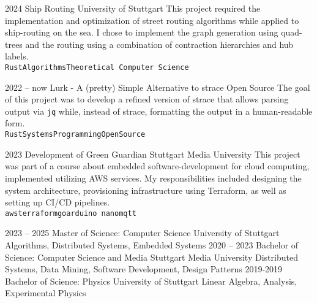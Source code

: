 \documentclass[9pt]{developercv} %
\begin{document}
\begin{entrylist}
	\entry
		{2024}
		{Ship Routing}
		{University of Stuttgart}
		{This project required the implementation and optimization of street routing algorithms while applied to ship-routing on the sea. I chose to implement the graph generation using quad-trees and the routing using a combination of contraction hierarchies and hub labels.
		\\ \texttt{Rust}\slashsep\texttt{Algorithms}\slashsep\texttt{Theoretical Computer Science}}	
	
	\entry
        {2022 -- now}
        {Lurk - A (pretty) Simple Alternative to strace}
        {Open Source}
        {The goal of this project was to develop a refined version of strace that allows parsing output via \texttt{jq} while, instead of strace, formatting the output in a human-readable form.
        \\ \texttt{Rust}\slashsep\texttt{SystemsProgramming}\slashsep\texttt{OpenSource}}
        
    \entry
        {2023}
        {Development of Green Guardian}
        {Stuttgart Media University}
        {This project was part of a course about embedded software-development for cloud computing, implemented utilizing AWS services. My responsibilities included designing the system architecture, provisioning infrastructure using Terraform, as well as setting up CI/CD pipelines.
        	\\ \texttt{aws}\slashsep\texttt{terraform}\slashsep\texttt{go}\slashsep\texttt{arduino nano}\slashsep\texttt{mqtt}}
\end{entrylist}



\begin{entrylist}
	\entry
        {2023 -- 2025}
        {Master of Science: Computer Science}
        {University of Stuttgart}
        {Algorithms, Distributed Systems, Embedded Systems}
	\entry
        {2020 -- 2023}
        {Bachelor of Science: Computer Science and Media}
        {Stuttgart Media University}
        {Distributed Systems, Data Mining, Software Development, Design Patterns}
	\entry
        {2019-2019}
        {Bachelor of Science: Physics}
        {University of Stuttgart}
        {Linear Algebra, Analysis, Experimental Physics}
\end{entrylist}
\end{document}
